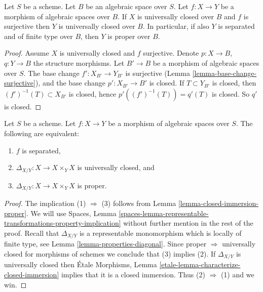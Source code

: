 \begin{lemma}
\label{lemma-image-proper-is-proper}
Let $S$ be a scheme. Let $B$ be an algebraic space over $S$.
Let $f : X \to Y$ be a morphism of algebraic spaces over $B$.
If $X$ is universally closed over $B$ and $f$ is surjective then
$Y$ is universally closed over $B$. In particular, if also $Y$ is
separated and of finite type over $B$, then $Y$ is proper over $B$.
\end{lemma}

\begin{proof}
Assume $X$ is universally closed and $f$ surjective.
Denote $p : X \to B$, $q : Y \to B$ the structure morphisms.
Let $B' \to B$ be a morphism of algebraic spaces over $S$.
The base change $f' : X_{B'} \to Y_{B'}$ is surjective
(Lemma \ref{lemma-base-change-surjective}), and the base
change $p' : X_{B'} \to B'$ is closed.
If $T \subset Y_{B'}$ is closed, then $(f')^{-1}(T) \subset X_{B'}$
is closed, hence $p'((f')^{-1}(T)) = q'(T)$ is closed.
So $q'$ is closed.
\end{proof}

\begin{lemma}
\label{lemma-separated-diagonal-proper}
Let $S$ be a scheme.
Let $f : X \to Y$ be a morphism of algebraic spaces over $S$.
The following are equivalent:
\begin{enumerate}
\item $f$ is separated,
\item $\Delta_{X/Y} : X \to X \times_Y X$ is universally closed, and
\item $\Delta_{X/Y} : X \to X \times_Y X$ is proper.
\end{enumerate}
\end{lemma}

\begin{proof}
The implication (1) $\Rightarrow$ (3) follows from
Lemma \ref{lemma-closed-immersion-proper}.
We will use
Spaces, Lemma
\ref{spaces-lemma-representable-transformations-property-implication}
without further mention in the rest of the proof.
Recall that $\Delta_{X/Y}$ is a representable
monomorphism which is locally of finite type, see
Lemma \ref{lemma-properties-diagonal}.
Since proper $\Rightarrow$ universally closed for morphisms of schemes
we conclude that (3) implies (2).
If $\Delta_{X/Y}$ is universally closed then
\'Etale Morphisms,
Lemma \ref{etale-lemma-characterize-closed-immersion}
implies that it is a closed immersion. Thus (2) $\Rightarrow$ (1)
and we win.
\end{proof}





